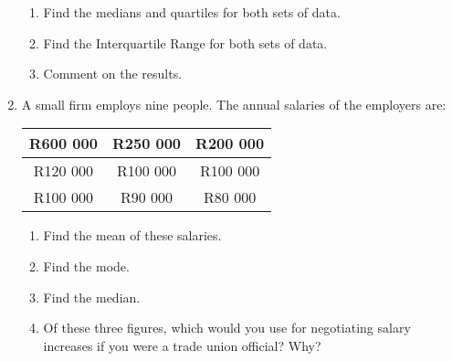 \documentclass[10pt,a4paper,titlepage,twoside,openright]{report}
\begin{document}
\begin{enumerate}
{\begin{enumerate}
\item Find the medians and quartiles for both sets of data.
\item Find the Interquartile Range for both sets of data.
\item Comment on the results.
\end{enumerate}
}

\item{A small firm employs nine people. The annual salaries of the employers are:
\begin{center}
\begin{tabular}{|c|c|c|}\hline
R600 000 & R250 000 & R200 000 \\\hline
R120 000 & R100 000 & R100 000 \\\hline
R100 000 & R90 000 & R80 000 \\\hline
\end{tabular}
\end{center}
\begin{enumerate}
\item Find the mean of these salaries.
\item Find the mode.
\item Find the median.
\item Of these three figures, which would you use for negotiating salary increases if you were a trade union official? Why?
\end{enumerate}
}
 

\end{enumerate}
\end{document}
